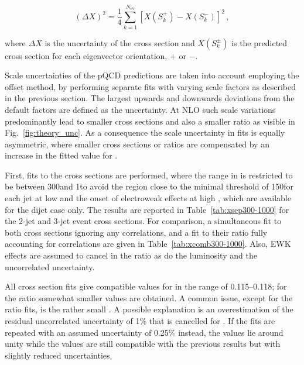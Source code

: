 \begin{equation}
  \label{ct10unc}
  (\Delta X)^2 = \frac{1}{4} \sum \limits_{k=1}^{N_\mathrm{ev}} [X(S_{k}^{+})-X(S_{k}^{-})]^2\,,
\end{equation}

where $\Delta X$ is the uncertainty of the cross section and $X(S_{k}^{\pm})$ is the predicted cross section for each eigenvector orientation, $+$ or $-$.

Scale uncertainties of the pQCD predictions are taken into account employing the offset method, \ie by performing separate fits with varying scale factors as described in the previous section. The largest upwards and downwards deviations from the default factors are defined as the uncertainty. At NLO such scale variations predominantly lead to smaller cross sections and also a smaller ratio \ratio as visible in Fig.~\ref{fig:theory_unc}. As a consequence the scale uncertainty in fits is equally asymmetric, where smaller cross sections or ratios are compensated by an increase in the fitted value for \alpsmz.

First, fits to the cross sections are performed, where the range in \httwo is restricted to be between 300\GeV and 1\TeV to avoid the region close to the minimal \pt threshold of 150\GeV for each jet at low \pt and the onset of electroweak effects at high \pt, which are available for the dijet case only. The results are reported in Table~\ref{tab:xsep300-1000} for the 2-jet and 3-jet event cross sections. For comparison, a simultaneous fit to both cross sections ignoring any correlations, and a fit to their ratio fully accounting for correlations are given in Table~\ref{tab:xcomb300-1000}. Also, EWK effects are assumed to cancel in the ratio as do the luminosity and the uncorrelated uncertainty.

All cross section fits give compatible values for \alpsmz in the range of 0.115--0.118; for the ratio \ratio somewhat smaller values are obtained. A common issue, except for the ratio fits, is the rather small \chisqndof. A possible explanation is an overestimation of the residual uncorrelated uncertainty of 1\% that is cancelled for \ratio. If the fits are repeated with an assumed uncertainty of 0.25\% instead, the \chisqndof values lie around unity while the \alpsmz values are still compatible with the previous results but with slightly reduced uncertainties.

